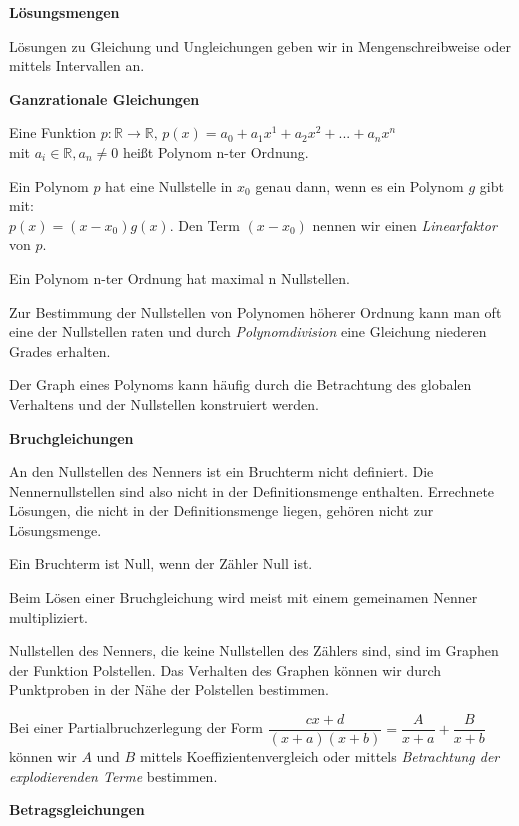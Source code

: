 \documentclass[a4paper]{article}
\begin{document}
\parindent 0mm

\textbf{Lösungsmengen}
\bigskip

Lösungen zu Gleichung und Ungleichungen geben wir in Mengenschreibweise oder mittels Intervallen an.
\bigskip

\textbf{Ganzrationale Gleichungen} 
\bigskip

Eine Funktion $p:\mathbb{R} \rightarrow \mathbb{R}, \,
p(x) = a_0 + a_1 x^1 + a_2 x^2 + ... + a_n x^n$ \\
mit $a_i \in \mathbb{R}, a_n \neq 0$ heißt Polynom n-ter Ordnung.

\bigskip
Ein Polynom $p$ hat  eine Nullstelle in $x_0$ genau dann, wenn es ein Polynom $g$ gibt mit: \\
$p(x) = (x-x_0)g(x)$. Den Term $(x-x_0)$ nennen wir einen \textit{Linearfaktor} von $p$.
\bigskip

Ein Polynom n-ter Ordnung hat maximal n Nullstellen.
\bigskip

Zur Bestimmung der Nullstellen von Polynomen höherer Ordnung kann man oft eine der Nullstellen raten und
durch \textit{Polynomdivision} eine Gleichung niederen Grades erhalten.
\bigskip

Der Graph eines Polynoms kann häufig durch 
die Betrachtung des globalen Verhaltens und der Nullstellen konstruiert werden.
\bigskip

\textbf{Bruchgleichungen} 
\bigskip

An den Nullstellen des Nenners ist ein Bruchterm nicht definiert. Die Nennernullstellen sind also nicht in der Definitionsmenge enthalten.
Errechnete Lösungen, die nicht in der Definitionsmenge liegen, gehören nicht zur Lösungsmenge.
\bigskip

Ein Bruchterm ist Null, wenn der Zähler Null ist.
\bigskip

Beim Lösen einer Bruchgleichung wird meist mit einem gemeinamen Nenner multipliziert.
\bigskip

Nullstellen des Nenners, die keine Nullstellen des Zählers sind, sind im Graphen der Funktion Polstellen.
Das Verhalten des Graphen können wir durch Punktproben in der Nähe der Polstellen bestimmen.
\bigskip

Bei einer Partialbruchzerlegung der Form $\dfrac{cx+d}{(x+a)(x+b)} = \dfrac{A}{x+a} + \dfrac{B}{x+b}$ können wir 
$A$ und $B$ mittels Koeffizientenvergleich oder mittels \textit{Betrachtung der explodierenden Terme} bestimmen.


\bigskip
 

\textbf{Betragsgleichungen}
\bigskip
\end{document}

